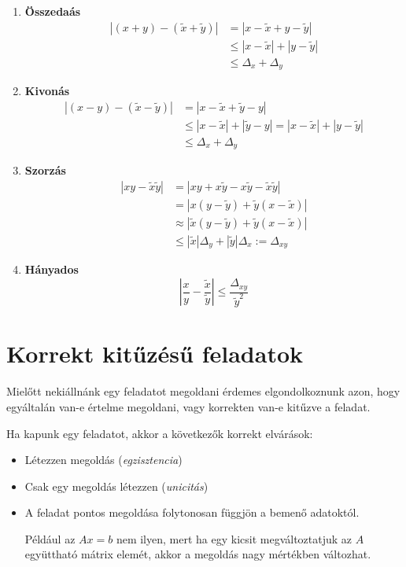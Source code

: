 \begin{enumerate}
    \item \textbf{Összedaás}
    \begin{align*}
        |(x+y) - (\tilde{x}+ \tilde{y})| & = | x - \tilde{x} + y - \tilde{y} | \\
        & \leq |x - \tilde{x}| + |y - \tilde{y}| \\
        & \leq \Delta_{x} + \Delta_{y}
    \end{align*}

    \item \textbf{Kivonás}
    \begin{align*}
        |(x - y) - (\tilde{x} - \tilde{y})| & = |x-\tilde{x} + \tilde{y} - y| \\
        & \leq |x - \tilde{x}| + |\tilde{y} -y| = |x - \tilde{x}| + |y - \tilde{y}| \\
        & \leq \Delta_{x} + \Delta_{y}
    \end{align*}

    \item \textbf{Szorzás}
    \begin{align*}
        | xy - \tilde{x}\tilde{y} | & = |xy + x\tilde{y} - x\tilde{y} -\tilde{x}\tilde{y}| \\
        & = |x(y-\tilde{y}) + \tilde{y}(x-\tilde{x})| \\
        & \approx |\tilde{x}(y-\tilde{y}) + \tilde{y}(x-\tilde{x})| \\ 
        & \leq |\tilde{x}|\Delta_{y} + |\tilde{y}| \Delta_{x} := \Delta_{xy}
    \end{align*}

    \item \textbf{Hányados}
    \begin{equation*}
        |\frac{x}{y} - \frac{\tilde{x}}{\tilde{y}}| \leq \frac{\Delta_{xy}}{\tilde{y}^{2}}
    \end{equation*}
\end{enumerate}

\section{Korrekt kitűzésű feladatok}
Mielőtt nekiállnánk egy feladatot megoldani érdemes elgondolkoznunk azon, hogy egyáltalán van-e értelme megoldani, vagy korrekten van-e kitűzve a feladat.

Ha kapunk egy feladatot, akkor a következők korrekt elvárások:
\begin{itemize}
    \item Létezzen megoldás (\textit{egzisztencia})
    \item Csak egy megoldás létezzen (\textit{unicitás})
    \item A feladat pontos megoldása folytonosan függjön a bemenő adatoktól.

    Például az $Ax = b$ nem ilyen, mert ha egy kicsit megváltoztatjuk az $A$ együttható mátrix elemét, akkor a megoldás nagy mértékben változhat.
\end{itemize}


